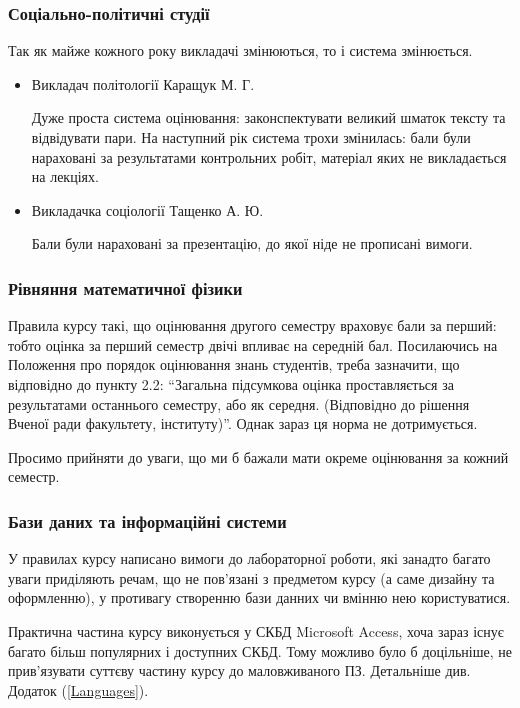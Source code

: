 \documentclass[14pt, a4paper]{extarticle}  %
\begin{document}
\subsubsection{Соціально-політичні студії}
Так як майже кожного року викладачі змінюються, то і система змінюється. 
\begin{itemize}
\item Викладач політології Каращук М. Г.

Дуже проста система оцінювання: законспектувати великий шматок тексту та відвідувати пари. На наступний рік система трохи змінилась: бали були нараховані за результатами контрольних робіт, матеріал яких не викладається на лекціях.

\item Викладачка соціології Тащенко А. Ю. 

Бали були нараховані за презентацію, до якої ніде не прописані вимоги. 
\end{itemize}

\subsubsection{Рівняння математичної фізики}

Правила курсу такі, що оцінювання другого семестру враховує бали за перший: тобто оцінка за перший семестр двічі впливає на середній бал. Посилаючись на Положення про порядок оцінювання знань студентів, треба зазначити, що відповідно до пункту 2.2: ``Загальна підсумкова оцінка проставляється за результатами останнього семестру, або як середня. (Відповідно до рішення Вченої ради факультету, інституту)''. Однак зараз ця норма не дотримується. 

Просимо прийняти до уваги, що ми б бажали мати окреме оцінювання за кожний семестр. 

\subsubsection{Бази даних та інформаційні системи}
У правилах курсу написано вимоги до лабораторної роботи, які занадто багато уваги приділяють речам, що не пов'язані з предметом курсу (а саме дизайну та оформленню), у противагу створенню бази данних чи вмінню нею користуватися. 

Практична частина курсу виконується у СКБД Microsoft Access, хоча зараз існує багато більш популярних і доступних СКБД. Тому можливо було б доцільніше, не прив'язувати суттєву частину курсу до маловживаного ПЗ. Детальніше див. Додаток (\ref{Languages}).
\end{document}
